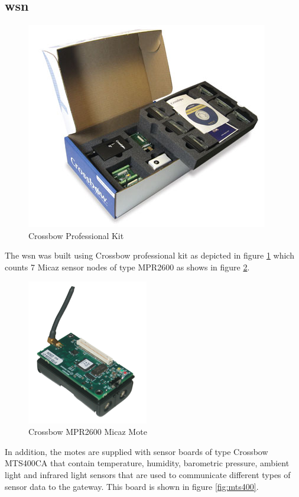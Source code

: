 \documentclass[oneside,12pt,a4paper,final]{book}
\begin{document}
\subsection{\gls{wsn}}

\begin{figure}[htbp]
\centering
\includegraphics[scale=0.6]{img/crossbow.jpg}
\caption{Crossbow Professional Kit}
\label{fig:crossbow}
\end{figure}

The \gls{wsn} was built using Crossbow professional kit as depicted in figure \ref{fig:crossbow} which counts 7 Micaz sensor nodes of type MPR2600 as shows in figure \ref{fig:micaz}.
\begin{figure}[htbp]
\centering
\includegraphics[scale=0.8]{img/micaz.png}
\caption{Crossbow MPR2600 Micaz Mote}
\label{fig:micaz}
\end{figure}

In addition, the motes are supplied with sensor boards of type Crossbow MTS400CA that contain temperature, humidity, barometric pressure, ambient light and infrared light sensors that are used to communicate different types of sensor data to the gateway. This board is shown in figure \ref{fig:mts400}.
\end{document}
